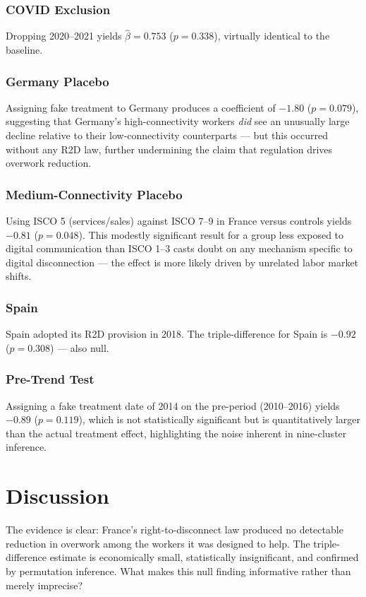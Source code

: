 \documentclass[12pt]{article}
\begin{document}
\subsubsection*{COVID Exclusion} Dropping 2020--2021 yields $\hat{\beta} = 0.753$ ($p = 0.338$), virtually identical to the baseline.

\subsubsection*{Germany Placebo} Assigning fake treatment to Germany produces a coefficient of $-1.80$ ($p = 0.079$), suggesting that Germany's high-connectivity workers \textit{did} see an unusually large decline relative to their low-connectivity counterparts --- but this occurred without any R2D law, further undermining the claim that regulation drives overwork reduction.

\subsubsection*{Medium-Connectivity Placebo} Using ISCO 5 (services/sales) against ISCO 7--9 in France versus controls yields $-0.81$ ($p = 0.048$). This modestly significant result for a group less exposed to digital communication than ISCO 1--3 casts doubt on any mechanism specific to digital disconnection --- the effect is more likely driven by unrelated labor market shifts.

\subsubsection*{Spain} Spain adopted its R2D provision in 2018. The triple-difference for Spain is $-0.92$ ($p = 0.308$) --- also null.

\subsubsection*{Pre-Trend Test} Assigning a fake treatment date of 2014 on the pre-period (2010--2016) yields $-0.89$ ($p = 0.119$), which is not statistically significant but is quantitatively larger than the actual treatment effect, highlighting the noise inherent in nine-cluster inference.


\section{Discussion}

The evidence is clear: France's right-to-disconnect law produced no detectable reduction in overwork among the workers it was designed to help. The triple-difference estimate is economically small, statistically insignificant, and confirmed by permutation inference. What makes this null finding informative rather than merely imprecise?
\end{document}
